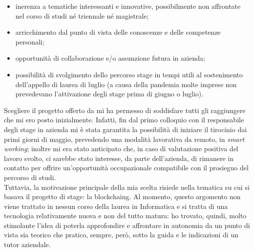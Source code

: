 \begin{itemize}
	\item inerenza a tematiche interessanti e innovative, possibilmente non affrontate nel corso di studi né triennale né magistrale;
	\item arricchimento dal punto di vista delle conoscenze e delle competenze personali;
	\item opportunità di collaborazione e/o assunzione futura in azienda;
	\item possibilità di svolgimento dello percorso stage in tempi utili al sostenimento dell'appello di laurea di luglio (a causa della pandemia molte imprese non prevedevano l'attivazione degli stage prima di giugno o luglio).
\end{itemize}
Scegliere il progetto offerto da \myCompany{} \companyTitle{} mi ha permesso di soddisfare tutti gli raggiungere che mi ero posto inizialmente. Infatti, fin dal primo colloquio con il responsabile degli stage in azienda mi è stata garantita la possibilità di iniziare il tirocinio dai primi giorni di maggio, prevedendo una modalità lavorativa da remoto, in \textit{smart working}; inoltre mi era stato anticipato che, in caso di valutazione positiva del lavoro svolto, ci sarebbe stato interesse, da parte dell'azienda, di rimanere in contatto per offrire un'opportunità occupazionale compatibile con il 
prosieguo del percorso di studi.\\
Tuttavia, la motivazione principale della mia scelta risiede nella tematica su cui si basava il progetto di stage: la \gls{blockchaing}. Al momento, questo argomento non viene trattato in nessun corso della laurea in Informatica e si tratta di una tecnologia relativamente nuova e non del tutto matura: ho trovato, quindi, molto stimolante l'idea di poterla approfondire e affrontare in autonomia da un punto di vista sia teorico che pratico, sempre, però, sotto la guida e le indicazioni di un tutor aziendale.
